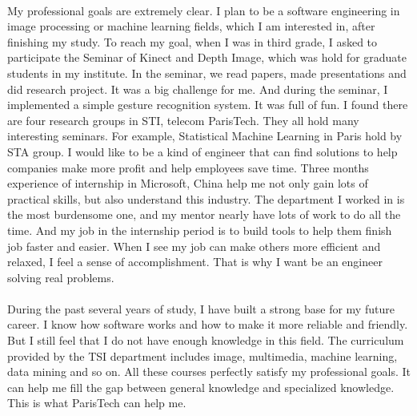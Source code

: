 \documentclass[a4paper]{article}
\begin{document}
\paragraph{}
My professional goals are extremely clear. I plan to be a software engineering in image processing or machine learning fields, which I am interested in, after finishing my study. To reach my goal, when I was in third grade, I asked to participate the Seminar of Kinect and Depth Image, which was hold for graduate students in my institute. In the seminar, we read papers, made presentations and did research project. It was a big challenge for me. And during the seminar, I implemented a simple gesture recognition system. It was full of fun. I found there are four research groups in STI, telecom ParisTech. They all hold many interesting seminars. For example, Statistical Machine Learning in Paris hold by STA group. I would like to be a kind of engineer that can find solutions to help companies make more profit and help employees save time. Three months experience of internship in Microsoft, China help me not only gain lots of practical skills, but also understand this industry. The department I worked in is the most burdensome one, and my mentor nearly have lots of work to do all the time. And my job in the internship period is to build tools to help them finish job faster and easier. When I see my job can make others more efficient and relaxed, I feel a sense of accomplishment. That is why I want be an engineer solving real problems.
\paragraph{}   
During the past several years of study, I have built a strong base for my future career. I know how software works and how to make it more reliable and friendly.  But I still feel that I do not have enough knowledge in this field. The curriculum provided by the TSI department includes image, multimedia, machine learning, data mining and so on. All these courses perfectly satisfy my professional goals. It can help me fill the gap between general knowledge and specialized knowledge. This is what ParisTech can help me.
\end{document}
